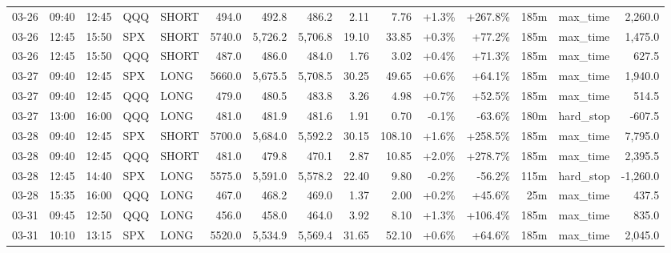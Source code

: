 \documentclass[11pt,a4paper,twoside]{article}
\begin{document}
\begin{landscape}
\begin{center}
\begin{longtable}{>{\color{txtmain}}l l l l l r r r r r r r r >{\color{txtmain}}l r}
03-26 & 09:40 & 12:45 & QQQ & SHORT & 494.0 & 492.8 & 486.2 & 2.11 & 7.76 & \textcolor{wingreen}{+1.3\%} & \textcolor{wingreen}{+267.8\%} & 185m & max\_time & \textcolor{wingreen}{2,260.0} \\
03-26 & 12:45 & 15:50 & SPX & SHORT & 5740.0 & 5,726.2 & 5,706.8 & 19.10 & 33.85 & \textcolor{wingreen}{+0.3\%} & \textcolor{wingreen}{+77.2\%} & 185m & max\_time & \textcolor{wingreen}{1,475.0} \\
03-26 & 12:45 & 15:50 & QQQ & SHORT & 487.0 & 486.0 & 484.0 & 1.76 & 3.02 & \textcolor{wingreen}{+0.4\%} & \textcolor{wingreen}{+71.3\%} & 185m & max\_time & \textcolor{wingreen}{627.5} \\
03-27 & 09:40 & 12:45 & SPX & LONG & 5660.0 & 5,675.5 & 5,708.5 & 30.25 & 49.65 & \textcolor{wingreen}{+0.6\%} & \textcolor{wingreen}{+64.1\%} & 185m & max\_time & \textcolor{wingreen}{1,940.0} \\
03-27 & 09:40 & 12:45 & QQQ & LONG & 479.0 & 480.5 & 483.8 & 3.26 & 4.98 & \textcolor{wingreen}{+0.7\%} & \textcolor{wingreen}{+52.5\%} & 185m & max\_time & \textcolor{wingreen}{514.5} \\
03-27 & 13:00 & 16:00 & QQQ & LONG & 481.0 & 481.9 & 481.6 & 1.91 & 0.70 & \textcolor{lossred}{-0.1\%} & \textcolor{lossred}{-63.6\%} & 180m & hard\_stop & \textcolor{lossred}{-607.5} \\
03-28 & 09:40 & 12:45 & SPX & SHORT & 5700.0 & 5,684.0 & 5,592.2 & 30.15 & 108.10 & \textcolor{wingreen}{+1.6\%} & \textcolor{wingreen}{+258.5\%} & 185m & max\_time & \textcolor{wingreen}{7,795.0} \\
03-28 & 09:40 & 12:45 & QQQ & SHORT & 481.0 & 479.8 & 470.1 & 2.87 & 10.85 & \textcolor{wingreen}{+2.0\%} & \textcolor{wingreen}{+278.7\%} & 185m & max\_time & \textcolor{wingreen}{2,395.5} \\
03-28 & 12:45 & 14:40 & SPX & LONG & 5575.0 & 5,591.0 & 5,578.2 & 22.40 & 9.80 & \textcolor{lossred}{-0.2\%} & \textcolor{lossred}{-56.2\%} & 115m & hard\_stop & \textcolor{lossred}{-1,260.0} \\
03-28 & 15:35 & 16:00 & QQQ & LONG & 467.0 & 468.2 & 469.0 & 1.37 & 2.00 & \textcolor{wingreen}{+0.2\%} & \textcolor{wingreen}{+45.6\%} & 25m & max\_time & \textcolor{wingreen}{437.5} \\
03-31 & 09:45 & 12:50 & QQQ & LONG & 456.0 & 458.0 & 464.0 & 3.92 & 8.10 & \textcolor{wingreen}{+1.3\%} & \textcolor{wingreen}{+106.4\%} & 185m & max\_time & \textcolor{wingreen}{835.0} \\
03-31 & 10:10 & 13:15 & SPX & LONG & 5520.0 & 5,534.9 & 5,569.4 & 31.65 & 52.10 & \textcolor{wingreen}{+0.6\%} & \textcolor{wingreen}{+64.6\%} & 185m & max\_time & \textcolor{wingreen}{2,045.0} \\

\end{longtable}
\end{center}
\end{landscape}
\end{document}
